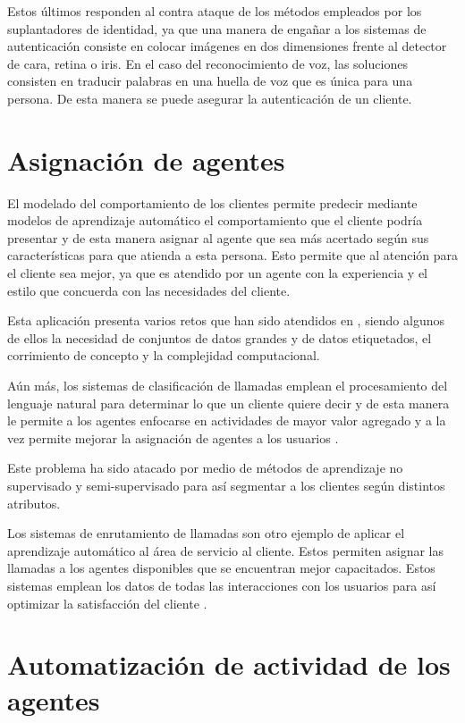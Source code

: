\documentclass[conference]{IEEEtran}
\begin{document}
Estos últimos responden al contra ataque de los métodos empleados por los suplantadores de identidad, ya que una manera de engañar a los sistemas de autenticación consiste en colocar imágenes en dos dimensiones frente al detector de cara, retina o iris. \cite{biometric}
En el caso del reconocimiento de voz, las soluciones consisten en traducir palabras en una huella de voz que es única para una persona. De esta manera se puede asegurar la autenticación de un cliente.

\section{Asignación de agentes}

El modelado del comportamiento de los clientes permite predecir mediante modelos de aprendizaje automático el comportamiento que el cliente podría presentar y de esta manera asignar al agente que sea más acertado según sus características para que atienda a esta persona. Esto permite que al atención para el cliente sea mejor, ya que es atendido por un agente con la experiencia y el estilo que concuerda con las necesidades del cliente.

Esta aplicación presenta varios retos que han sido atendidos en \cite{user_modeling}, siendo algunos de ellos la necesidad de conjuntos de datos grandes y de datos etiquetados, el corrimiento de concepto y la complejidad computacional.

Aún más, los sistemas de clasificación de llamadas emplean el procesamiento del lenguaje natural para determinar lo que un cliente quiere decir y de esta manera le permite a los agentes enfocarse en actividades de mayor valor agregado y a la vez permite mejorar la asignación de agentes a los usuarios \cite{11cases}.

Este problema ha sido atacado por medio de métodos de aprendizaje no supervisado \cite{9254369} y semi-supervisado para así segmentar a los clientes según distintos atributos.

Los sistemas de enrutamiento de llamadas son otro ejemplo de aplicar el aprendizaje automático al área de servicio al cliente. Estos permiten asignar las llamadas a los agentes disponibles que se encuentran mejor capacitados. Estos sistemas emplean los datos de todas las interacciones con los usuarios para así optimizar la satisfacción del cliente \cite{11cases}.

\section{Automatización de actividad de los agentes}
\end{document}

